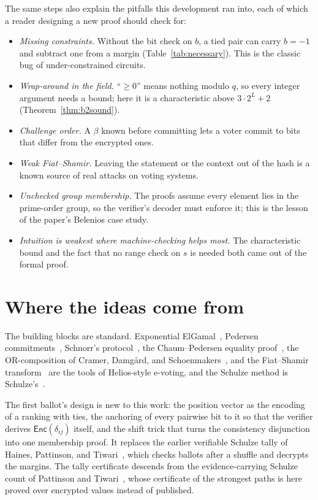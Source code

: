 \documentclass[11pt,a4paper]{article}
\newcommand{\Enc}{\mathsf{Enc}}
\theoremstyle{remark}
\begin{document}
The same steps also explain the pitfalls this development ran into, each
of which a reader designing a new proof should check for:
\begin{itemize}[leftmargin=*]
  \item \emph{Missing constraints.} Without the bit check on $b$, a tied
  pair can carry $b = -1$ and subtract one from a margin
  (Table~\ref{tab:necessary}). This is the classic bug of
  under-constrained circuits.
  \item \emph{Wrap-around in the field.} ``$\ge 0$'' means nothing modulo
  $q$, so every integer argument needs a bound; here it is a characteristic
  above $3 \cdot 2^L + 2$ (Theorem~\ref{thm:b2sound}).
  \item \emph{Challenge order.} A $\beta$ known before committing lets a
  voter commit to bits that differ from the encrypted ones.
  \item \emph{Weak Fiat--Shamir.} Leaving the statement or the context out
  of the hash is a known source of real attacks on voting systems.
  \item \emph{Unchecked group membership.} The proofs assume every element
  lies in the prime-order group, so the verifier's decoder must enforce it;
  this is the lesson of the paper's Belenios case study.
  \item \emph{Intuition is weakest where machine-checking helps most.} The
  characteristic bound and the fact that no range check on $s$ is needed
  both came out of the formal proof.
\end{itemize}

\section{Where the ideas come from}\label{sec:sources}
The building blocks are standard. Exponential ElGamal~\cite{elgamal},
Pedersen commitments~\cite{pedersen}, Schnorr's protocol~\cite{schnorr},
the Chaum--Pedersen equality proof~\cite{chaumpedersen}, the
OR-composition of Cramer, Damg{\aa}rd, and Schoenmakers~\cite{cds}, and the
Fiat--Shamir transform~\cite{fiatshamir} are the tools of Helios-style
e-voting, and the Schulze method is Schulze's~\cite{schulze}.

The first ballot's design is new to this work: the position vector as the
encoding of a ranking with ties, the anchoring of every pairwise bit to it
so that the verifier derives $\Enc(\delta_{ij})$ itself, and the shift
trick that turns the consistency disjunction into one membership proof. It
replaces the earlier verifiable Schulze tally of Haines, Pattinson, and
Tiwari~\cite{hpt19}, which checks ballots after a shuffle and decrypts the
margins. The tally certificate descends from the evidence-carrying Schulze
count of Pattinson and Tiwari~\cite{pt17}, whose certificate of the
strongest paths is here proved over encrypted values instead of
published.
\end{document}
